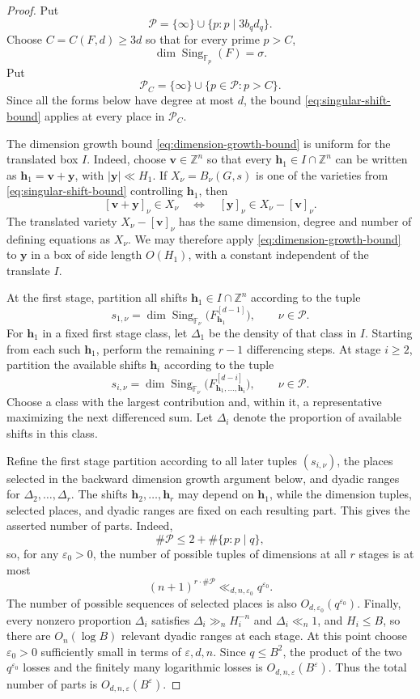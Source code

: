 \documentclass[reqno,a4paper,11pt]{amsart}
\numberwithin{equation}{section}
\newcommand{\ZZ}{\mathbb Z}
\newcommand{\h}{\mathbf h}
\newcommand{\eps}{\varepsilon}
\theoremstyle{plain}
\theoremstyle{definition}
\begin{document}
\begin{proof}
Put
\[
 \mathcal P=\{\infty\}\cup\{p:p\mid3b_qd_q\}.
\]
Choose \(C=C(F,d)\geq3d\) so that for every prime \(p>C\),
\[
 \dim\operatorname{Sing}_{\mathbb F_p}(F)=\sigma.
\]
Put
\[
 \mathcal P_C=\{\infty\}\cup\{p\in\mathcal P:p>C\}.
\]
Since all the forms below have degree at most \(d\), the bound \eqref{eq:singular-shift-bound} applies at every place in \(\mathcal P_C\).

The dimension growth bound \eqref{eq:dimension-growth-bound} is uniform for the translated box \(I\).
Indeed, choose \(\mathbf v\in\ZZ^n\) so that every \(\h_1\in I\cap\ZZ^n\) can be written as \(\h_1=\mathbf v+\mathbf y\), with \(|\mathbf y|\ll H_1\).
If \(X_\nu=B_\nu(G,s)\) is one of the varieties from \eqref{eq:singular-shift-bound} controlling \(\h_1\), then
\[
 [\mathbf v+\mathbf y]_\nu\in X_\nu
 \quad\Longleftrightarrow\quad
 [\mathbf y]_\nu\in X_\nu-[\mathbf v]_\nu.
\]
The translated variety \(X_\nu-[\mathbf v]_\nu\) has the same dimension, degree and number of defining equations as \(X_\nu\).
We may therefore apply \eqref{eq:dimension-growth-bound} to \(\mathbf y\) in a box of side length \(O(H_1)\), with a constant independent of the translate \(I\).

At the first stage, partition all shifts \(\h_1\in I\cap\ZZ^n\) according to the tuple
\[
 s_{1,\nu}
 =
 \dim\operatorname{Sing}_{\mathbb F_\nu}
 \bigl(F_{\h_1}^{[d-1]}\bigr),
 \qquad \nu\in\mathcal P.
\]
For \(\h_1\) in a fixed first stage class, let \(\Delta_1\) be the density of that class in \(I\).
Starting from each such \(\h_1\), perform the remaining \(r-1\) differencing steps.
At stage \(i\geq2\), partition the available shifts \(\h_i\) according to the tuple
\[
 s_{i,\nu}
 =
 \dim\operatorname{Sing}_{\mathbb F_\nu}
 \bigl(F_{\h_1,\ldots,\h_i}^{[d-i]}\bigr),
 \qquad \nu\in\mathcal P.
\]
Choose a class with the largest contribution and, within it, a representative maximizing the next differenced sum.
Let \(\Delta_i\) denote the proportion of available shifts in this class.

Refine the first stage partition according to all later tuples \((s_{i,\nu})\), the places selected in the backward dimension growth argument below, and dyadic ranges for \(\Delta_2,\ldots,\Delta_r\).
The shifts \(\h_2,\ldots,\h_r\) may depend on \(\h_1\), while the dimension tuples, selected places, and dyadic ranges are fixed on each resulting part.
This gives the asserted number of parts.
Indeed,
\[
 \#\mathcal P\leq2+\#\{p:p\mid q\},
\]
so, for any \(\eps_0>0\), the number of possible tuples of dimensions at all \(r\) stages is at most
\[
 (n+1)^{r \cdot \#\mathcal P}\ll_{d,n,\eps_0}q^{\eps_0}.
\]
The number of possible sequences of selected places is also \(O_{d,\eps_0}(q^{\eps_0})\).
Finally, every nonzero proportion \(\Delta_i\) satisfies \(\Delta_i\gg_n H_i^{-n}\) and \(\Delta_i\ll_n1\), and \(H_i\leq B\), so there are \(O_n(\log B)\) relevant dyadic ranges at each stage.
At this point choose \(\eps_0>0\) sufficiently small in terms of \(\eps,d,n\).
Since \(q\leq B^2\), the product of the two \(q^{\eps_0}\) losses and the finitely many logarithmic losses is \(O_{d,n,\eps}(B^\eps)\).
Thus the total number of parts is \(O_{d,n,\eps}(B^\eps)\).


\end{proof}
\end{document}
